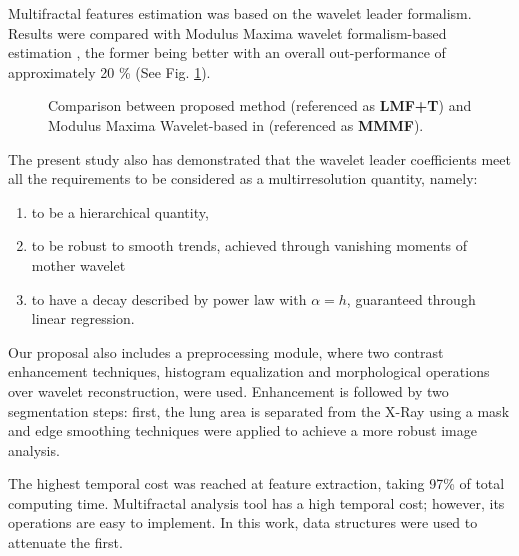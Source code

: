 \documentclass{article}
\begin{document}
Multifractal features estimation was based on the wavelet leader formalism. Results were compared with Modulus Maxima wavelet formalism-based estimation \citep{juanda}, the former being better with an overall out-performance of approximately 20 \% (See Fig. \ref{mma_comp}).  

\begin{figure}[ht]
	\centering
	\caption{Comparison between proposed method (referenced as \textbf{LMF+T}) and Modulus Maxima Wavelet-based in \citep{juanda} (referenced as \textbf{MMMF}). } \label{mma_comp}
\end{figure}

The present study also has demonstrated that the wavelet leader coefficients meet all the requirements to be considered as a multirresolution quantity, namely: 
\begin{enumerate}[i]
	\item to be a hierarchical quantity,
	\item to be robust to smooth trends, achieved through vanishing moments of mother wavelet
	\item to have a decay described by power law with $\alpha = h$, guaranteed through linear regression.
\end{enumerate}

Our proposal also includes a preprocessing module, where two contrast enhancement techniques, histogram equalization and morphological operations over wavelet reconstruction, were used. Enhancement is followed by two segmentation steps: first, the lung area is separated from the X-Ray using a mask and edge smoothing techniques were applied to achieve a more robust image analysis.

The highest temporal cost was reached at feature extraction, taking 97\% of total computing time.  Multifractal analysis tool has a high temporal cost; however, its operations are easy to implement. In this work, data structures were used to attenuate the first.


  
\end{document}
